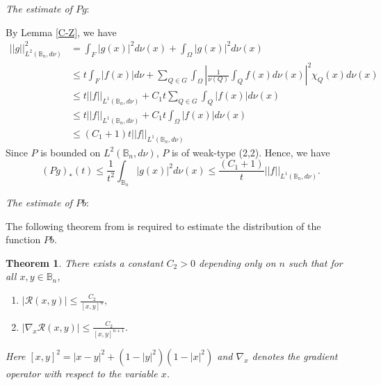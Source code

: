 \documentclass[12pt]{amsart}
\newtheorem{theorem}{Theorem}[section]
\theoremstyle{definition}
\theoremstyle{remark}
\newcommand{\B}{\mathbb{B}}
\begin{document}
\textit{The estimate of $Pg$}:

By Lemma \ref{C-Z}, we have
\begin{equation*}
	\begin{aligned}
		||g||_{L^2(\B_n,d\nu)}^2&=\int_{F}|g(x)|^2d\nu (x)+\int_{\Omega}|g(x)|^2d\nu (x)\\
		&\leqslant t\int_{F}|f(x)|d\nu +\sum\limits_{Q\in G}\int_{\Omega}\left|\frac{1}{\nu (Q)}\int_{Q}f(x)d\nu (x)\right|^2\chi_Q(x)d\nu (x)\\
		&\leqslant t||f||_{L^1(\B_n,d\nu)}+C_1 t\sum\limits_{Q\in G}\int_{Q}\left|f(x)\right|d\nu (x)\\
		&\leqslant t||f||_{L^1(\B_n,d\nu)}+C_1 t\int_{\Omega}|f(x)|d\nu (x)\\
		&\leqslant(C_1+1)  t||f||_{L^1(\B_n,d\nu)}
	\end{aligned}
\end{equation*}
Since $P$ is bounded on $L^2(\B_n,d\nu)$, $P$ is of weak-type (2,2). 
Hence, we have
\[(P  g)_*(t)\leqslant\frac{1}{t^2}\int_{\B_n}|g(x)|^2d\nu (x)\leqslant \frac{(C_1+1)}{t}||f||_{L^1(\B_n,d\nu)}.\]

\textit{The estimate of $Pb$}:

The following theorem from \cite{Ureyen2023} is required to estimate the distribution of the function $P b$.

\begin{theorem}\label{th2.1}
	There exists a constant $C_2>0$ depending only on $n$ such that for all $x,y\in\B_n$,
	\begin{enumerate}[{(i)}]
		\item $|\mathcal{R} (x,y)|\leqslant\frac{C_2}{[x,y]^{n}},$
		\item $|\nabla_x\mathcal{R} (x,y)|\leqslant\frac{C_2}{[x,y]^{n+1}}.$
	\end{enumerate}
	Here $[x,y]^2=|x-y|^2+(1-|y|^2)(1-|x|^2)$ and $\nabla_x$ denotes the gradient operator with respect to the variable $x$.
\end{theorem}
\end{document}
